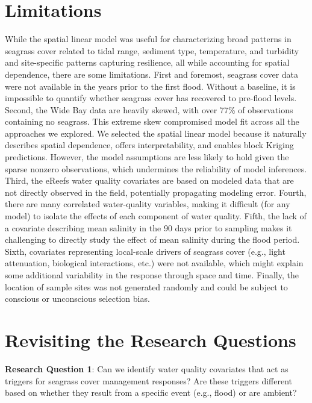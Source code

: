 \documentclass[
  letterpaper,
  DIV=11,
  numbers=noendperiod]{scrartcl}
\begin{document}
\section{Limitations}\label{limitations}

While the spatial linear model was useful for characterizing broad
patterns in seagrass cover related to tidal range, sediment type,
temperature, and turbidity and site-specific patterns capturing
resilience, all while accounting for spatial dependence, there are some
limitations. First and foremost, seagrass cover data were not available
in the years prior to the first flood. Without a baseline, it is
impossible to quantify whether seagrass cover has recovered to pre-flood
levels. Second, the Wide Bay data are heavily skewed, with over 77\% of
observations containing no seagrass. This extreme skew compromised model
fit across all the approaches we explored. We selected the spatial
linear model because it naturally describes spatial dependence, offers
interpretability, and enables block Kriging predictions. However, the
model assumptions are less likely to hold given the sparse nonzero
observations, which undermines the reliability of model inferences.
Third, the eReefs water quality covariates are based on modeled data
that are not directly observed in the field, potentially propagating
modeling error. Fourth, there are many correlated water-quality
variables, making it difficult (for any model) to isolate the effects of
each component of water quality. Fifth, the lack of a covariate
describing mean salinity in the 90 days prior to sampling makes it
challenging to directly study the effect of mean salinity during the
flood period. Sixth, covariates representing local-scale drivers of
seagrass cover (e.g., light attenuation, biological interactions, etc.)
were not available, which might explain some additional variability in
the response through space and time. Finally, the location of sample
sites was not generated randomly and could be subject to conscious or
unconscious selection bias.

\section{Revisiting the Research
Questions}\label{revisiting-the-research-questions}

\textbf{Research Question 1}: Can we identify water quality covariates
that act as triggers for seagrass cover management responses? Are these
triggers different based on whether they result from a specific event
(e.g., flood) or are ambient?
\end{document}
